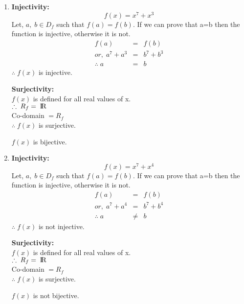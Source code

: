 \documentclass{article}
\begin{document}
\begin{enumerate}
\item{
\begin{minipage}[t]{0.4\linewidth}
\textbf{Injectivity:}
    $$f(x) = x^7 + x^3$$
Let, $a,\;b\in D_f$ such that $f(a) = f(b)$. If we can prove that a=b then the function is injective, otherwise it is not.
\begin{eqnarray*}
    f(a) &=& f(b)\\
    or,\;a^7+a^3 &=& b^7 + b^3\\
    \therefore\; a &=& b
\end{eqnarray*}
$\therefore\;f(x)$ is injective.
\end{minipage}\hfill
\begin{minipage}[t]{0.4\linewidth}
\textbf{Surjectivity:}
\\$f(x)$ is defined for all real values of x.\\
$\therefore\; R_f = \;\rm I\!R$
\\Co-domain $=R_f$\\
$\therefore\;f(x)$ is surjective.
\end{minipage}
\vspace{1cm}
\begin{center}
$f(x)$ is bijective.
\end{center}
\vspace{1cm}
}

\item{

\begin{minipage}[t]{0.4\linewidth}
\textbf{Injectivity:}
    $$f(x) = x^7 + x^4$$
Let, $a,\;b\in D_f$ such that $f(a) = f(b)$. If we can prove that a=b then the function is injective, otherwise it is not.
\begin{eqnarray*}
    f(a) &=& f(b)\\
    or,\;a^7+a^4 &=& b^7 + b^4\\
    \therefore\; a &\ne& b
\end{eqnarray*}
$\therefore\;f(x)$ is not injective.
\end{minipage}\hfill
\begin{minipage}[t]{0.4\linewidth}
\textbf{Surjectivity:}
\\$f(x)$ is defined for all real values of x.\\
$\therefore\; R_f = \;\rm I\!R$
\\Co-domain $=R_f$\\
$\therefore\;f(x)$ is surjective.
\end{minipage}
\vspace{1cm}
\begin{center}
$f(x)$ is not bijective.
\end{center}
\vspace{1cm}
}


\end{enumerate}
\end{document}
